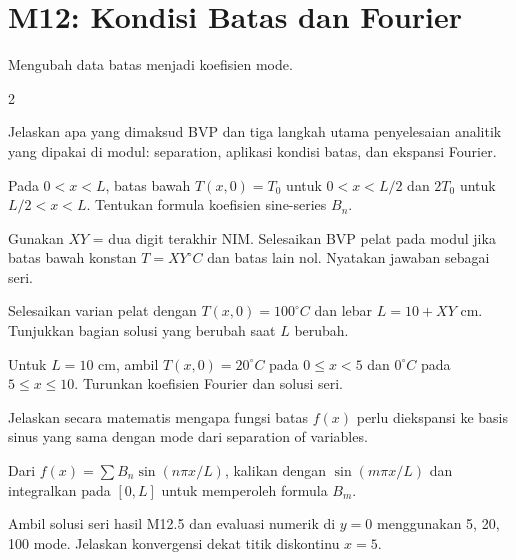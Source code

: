 \documentclass[10pt,a4paper]{article}
\newcommand{\level}[1]{\colorbox{levelbg}{\scriptsize\strut #1}}
\newcommand{\src}[1]{\colorbox{sourcebg}{\scriptsize\strut #1}}
\begin{document}
\section*{M12: Kondisi Batas dan Fourier}
{\color{iteraGray}\small Mengubah data batas menjadi koefisien mode.}\par\vspace{1mm}
\begin{multicols}{2}
\begin{qbox}[title={M12.1: Definisi dan tiga langkah BVP\hfill \level{L1}\;\src{PR}}]
\small Jelaskan apa yang dimaksud BVP dan tiga langkah utama penyelesaian analitik yang dipakai di modul: separation, aplikasi kondisi batas, dan ekspansi Fourier.
\end{qbox}
\begin{qbox}[title={M12.2: Data batas potongan\hfill \level{L3}\;\src{Var}}]
\small Pada $0<x<L$, batas bawah $T(x,0)=T_0$ untuk $0<x<L/2$ dan $2T_0$ untuk $L/2<x<L$. Tentukan formula koefisien sine-series $B_n$.
\end{qbox}
\begin{qbox}[title={M12.3: Varian NIM\hfill \level{L3}\;\src{PR}}]
\small Gunakan $XY$ = dua digit terakhir NIM. Selesaikan BVP pelat pada modul jika batas bawah konstan $T=XY^\circ C$ dan batas lain nol. Nyatakan jawaban sebagai seri.
\end{qbox}
\begin{qbox}[title={M12.4: Lebar domain berubah\hfill \level{L3}\;\src{PR}}]
\small Selesaikan varian pelat dengan $T(x,0)=100^\circ C$ dan lebar $L=10+XY$ cm. Tunjukkan bagian solusi yang berubah saat $L$ berubah.
\end{qbox}
\begin{qbox}[title={M12.5: Batas bawah piecewise\hfill \level{L4}\;\src{PR}}]
\small Untuk $L=10$ cm, ambil $T(x,0)=20^\circ C$ pada $0\le x<5$ dan $0^\circ C$ pada $5\le x\le10$. Turunkan koefisien Fourier dan solusi seri.
\end{qbox}
\begin{qbox}[title={M12.6: Mengapa Fourier muncul lagi?\hfill \level{L2}\;\src{Var}}]
\small Jelaskan secara matematis mengapa fungsi batas $f(x)$ perlu diekspansi ke basis sinus yang sama dengan mode dari separation of variables.
\end{qbox}
\begin{qbox}[title={M12.7: Orthogonality extraction\hfill \level{L3}\;\src{Var}}]
\small Dari $f(x)=\sum B_n\sin(n\pi x/L)$, kalikan dengan $\sin(m\pi x/L)$ dan integralkan pada $[0,L]$ untuk memperoleh formula $B_m$.
\end{qbox}
\begin{qbox}[title={M12.8: Uji batas bawah\hfill \level{L3}\;\src{Var}}]
\small Ambil solusi seri hasil M12.5 dan evaluasi numerik di $y=0$ menggunakan 5, 20, 100 mode. Jelaskan konvergensi dekat titik diskontinu $x=5$.
\end{qbox}
\end{multicols}
\newpage
\end{document}
